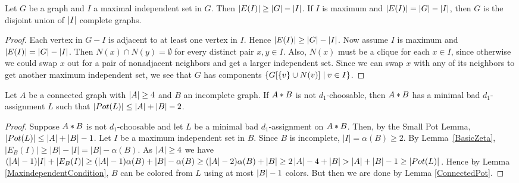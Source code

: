 \begin{lem}\label{BasicZeta}
Let $G$ be a graph and $I$ a maximal independent set in $G$. Then $\left|E(I)\right| \geq \left|G\right| - \left|I\right|$.  If $I$ is maximum and $\left|E(I)\right| = \left|G\right| - \left|I\right|$, then $G$ is the disjoint union of $\left|I\right|$ complete graphs.
\end{lem}
\begin{proof}
Each vertex in $G-I$ is adjacent to at least one vertex in $I$.  Hence $\left|E(I)\right| \geq \left|G\right| - \left|I\right|$.
Now assume $I$ is maximum and $\left|E(I)\right| = \left|G\right| - \left|I\right|$.  Then $N(x)
\cap N(y) = \emptyset$ for every distinct pair $x,y \in I$.  Also, $N(x)$ must
be a clique for each $x \in I$, since otherwise we could swap $x$ out for a pair of nonadjacent neighbors and get a larger independent set.  Since we can swap $x$ with any of its neighbors to get another maximum independent set, we see that $G$ has components $\left\{ G[\left\{ v \right\} \cup N(v)] \mid v \in I \right\}$.
\end{proof}

\begin{lem}\label{ConnectedAtLeast4}
Let $A$ be a connected graph with $\left|A\right| \geq 4$ and $B$ an incomplete graph.  If $A \mbox{\hspace{2 pt}$\ast$\hspace{2 pt}} B$ is not $d_1$-choosable, then $A \mbox{\hspace{2 pt}$\ast$\hspace{2 pt}} B$ has a minimal bad $d_1$-assignment $L$ such that $\left|Pot(L)\right| \leq \left|A\right| + \left|B\right| - 2$.
\end{lem}
\begin{proof}
Suppose $A \mbox{\hspace{2 pt}$\ast$\hspace{2 pt}} B$ is not $d_1$-choosable and let $L$ be a minimal bad
$d_1$-assignment on $A \mbox{\hspace{2 pt}$\ast$\hspace{2 pt}} B$.  Then, by the Small Pot Lemma, $\left|Pot(L)\right|
\leq \left|A\right| + \left|B\right| - 1$.  Let $I$ be a maximum independent set in $B$.  
Since $B$ is incomplete, $|I|=\alpha(B) \geq 2$.  
By Lemma~\ref{BasicZeta}, $|E_B(I)|\ge |B|-|I|=|B|-\alpha(B)$.  
As $\left|A\right| \geq 4$ we have $(\left|A\right| - 1)|I| + |E_B(I)| \ge
(\left|A\right| - 1)\alpha(B) + \left|B\right| - \alpha(B) 
\geq (|A|-2)\alpha(B)+|B|
\geq 2\left|A\right| - 4 + \left|B\right| > \left|A\right| + \left|B\right| - 1 \geq \left|Pot(L)\right|$.  
Hence by Lemma \ref{MaxindependentCondition}, $B$ can be colored from $L$ using at most $\left|B\right| - 1$ colors.  But then we are done by Lemma \ref{ConnectedPot}.
\end{proof}

